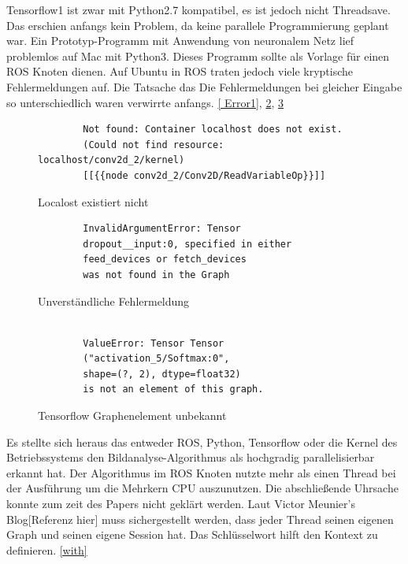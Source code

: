 \documentclass[conference]{IEEEtran}
\begin{document}
	Tensorflow1 ist zwar mit Python2.7 kompatibel, es ist jedoch nicht 
	Threadsave. Das erschien anfangs kein Problem, da keine parallele 
	Programmierung geplant war. Ein Prototyp-Programm mit Anwendung von 
	neuronalem Netz lief problemlos auf Mac mit Python3. Dieses Programm 
	sollte als Vorlage für einen ROS Knoten dienen. Auf Ubuntu in ROS traten 
	jedoch viele kryptische Fehlermeldungen auf.  Die Tatsache das Die 
	Fehlermeldungen bei gleicher Eingabe so unterschiedlich waren verwirrte 
	anfangs. \ref{ Error1}, \ref{Error2}, \ref{Error3}
	
	\begin{figure}
		\centering
		\begin{verbatim}
		Not found: Container localhost does not exist. 
		(Could not find resource: localhost/conv2d_2/kernel)
		[[{{node conv2d_2/Conv2D/ReadVariableOp}}]]
		\end{verbatim}
		\label{Error1}
		\caption{Localost existiert nicht}
	\end{figure}
	
	\begin{figure}
		\centering
		\begin{verbatim}
		InvalidArgumentError: Tensor 
		dropout__input:0, specified in either 
		feed_devices or fetch_devices
		was not found in the Graph
		\end{verbatim}
		\label{Error2}
		\caption{Unverständliche Fehlermeldung}
	\end{figure}
	
	
	
	\begin{figure}
		\centering
		\begin{verbatim}
		
		ValueError: Tensor Tensor
		("activation_5/Softmax:0",
		shape=(?, 2), dtype=float32) 
		is not an element of this graph.
		\end{verbatim}
		\label{Error3}
		\caption{Tensorflow Graphenelement unbekannt}
	\end{figure}
	
	Es stellte sich heraus das entweder ROS, Python, Tensorflow oder die Kernel 
	des Betriebssystems den Bildanalyse-Algorithmus als hochgradig 
	parallelisierbar erkannt hat. Der Algorithmus im  ROS Knoten nutzte mehr 
	als einen Thread bei der Ausführung um die Mehrkern CPU auszunutzen. 
	Die abschließende Uhrsache konnte zum zeit des Papers nicht geklärt 
	werden.
	Laut Victor Meunier's Blog[Referenz hier] %
	muss sichergestellt werden, dass jeder Thread seinen eigenen Graph und seinen eigene Session hat. Das Schlüsselwort  hilft den Kontext zu definieren. \ref{with} \\
	
\end{document}
